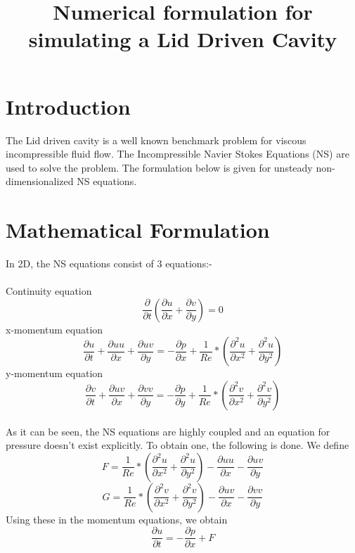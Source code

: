 \documentclass{article}
\title{Numerical formulation for simulating a Lid Driven Cavity}
\begin{document}
\maketitle
\section{Introduction}
The Lid driven cavity is a well known benchmark problem for viscous incompressible fluid flow. The Incompressible Navier Stokes Equations (NS) are used to solve the problem. The formulation below is given for unsteady non-dimensionalized NS equations.\\

\section{Mathematical Formulation}

In 2D, the NS equations consist of 3 equations:-\\\\
Continuity equation\\
\begin{equation}\label{continuity}
\frac{\partial }{\partial t}(\frac{\partial u}{\partial x} + \frac{\partial v}{\partial y}) = 0
\end{equation}
x-momentum equation\\
\begin{equation}
\frac{\partial u}{\partial t} + \frac{\partial uu}{\partial x} + \frac{\partial uv}{\partial y} = -\frac{\partial p}{\partial x} + \frac{1}{Re} * ({\frac{\partial^2 u}{\partial x^2} + \frac{\partial^2 u}{\partial y^2}})
\end{equation}
y-momentum equation\\
\begin{equation}
\frac{\partial v}{\partial t} + \frac{\partial uv}{\partial x} + \frac{\partial vv}{\partial y} = -\frac{\partial p}{\partial y} + \frac{1}{Re} * ({\frac{\partial^2 v}{\partial x^2} + \frac{\partial^2 v}{\partial y^2}})
\end{equation}\\
As it can be seen, the NS equations are highly coupled and an equation for pressure doesn't exist explicitly. To obtain one, the following is done. We define\\
\begin{equation}\label{F}
    F = \frac{1}{Re} * ({\frac{\partial^2 u}{\partial x^2} + \frac{\partial^2 u}{\partial y^2}}) - \frac{\partial uu}{\partial x} - \frac{\partial uv}{\partial y}
\end{equation}
\begin{equation}\label{G}
    G = \frac{1}{Re} * ({\frac{\partial^2 v}{\partial x^2} + \frac{\partial^2 v}{\partial y^2}}) - \frac{\partial uv}{\partial x} - \frac{\partial vv}{\partial y}
\end{equation}
Using these in the momentum equations, we obtain
\begin{equation}
    \frac{\partial u}{\partial t} = -\frac{\partial p}{\partial x} + F
\end{equation}
\end{document}
